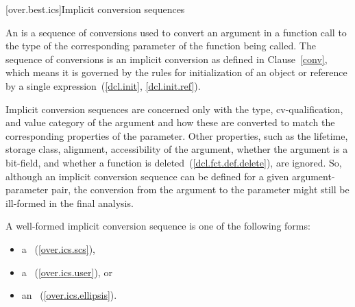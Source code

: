[over.best.ics]{Implicit conversion sequences}%

\pnum
An
%
is a sequence of conversions used
to convert an argument in a function call to the type of the
corresponding parameter of the function being called.
The
sequence of conversions is an implicit conversion as defined in
Clause~\ref{conv}, which means it is governed by the rules for
initialization of an object or reference by a single
expression~(\ref{dcl.init}, \ref{dcl.init.ref}).

\pnum
Implicit conversion sequences are concerned only with the type,
cv-qualification, and value category of the argument and how these
are converted to match the corresponding properties of the
parameter.
Other properties, such as the lifetime, storage class,
alignment, accessibility of the argument, whether the argument is a bit-field,
and whether a function is deleted~(\ref{dcl.fct.def.delete}), are ignored.
So, although an implicit
conversion sequence can be defined for a given argument-parameter
pair, the conversion from the argument to the parameter might still
be ill-formed in the final analysis.

\pnum
A
well-formed implicit conversion
sequence is one of the following forms:

\begin{itemize}
\item
a
~(\ref{over.ics.scs}),
\item
a
~(\ref{over.ics.user}), or
\item
an
~(\ref{over.ics.ellipsis}).
\end{itemize}


